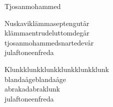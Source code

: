 \begin{song}{Tjosanmohammed}

    
	
	Nuskaviklämmaseptengutår\\
	klämmaentrudeluttomdegår\\
	tjosanmohammedsnartedevår\\
	julaftoneenfreda
	
	Klunkklunkklunkklunkklunkklunk\\
	blandaågeblandaåge\\
	abrakadabraklunk\\
	julaftoneenfreda
	
\end{song}
